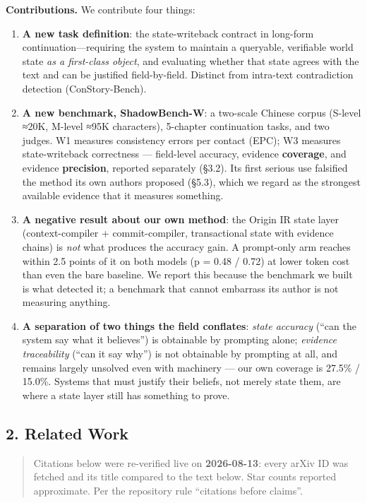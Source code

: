 \documentclass[
  english,
]{article}
\providecommand{\tightlist}{%
  \setlength{\itemsep}{0pt}\setlength{\parskip}{0pt}}
\begin{document}
\textbf{Contributions.} We contribute four things:

\begin{enumerate}
\def\labelenumi{\arabic{enumi}.}
\tightlist
\item
  \textbf{A new task definition}: the state-writeback contract in
  long-form continuation---requiring the system to maintain a queryable,
  verifiable world state \emph{as a first-class object}, and evaluating
  whether that state agrees with the text and can be justified
  field-by-field. Distinct from intra-text contradiction detection
  (ConStory-Bench).
\item
  \textbf{A new benchmark, ShadowBench-W}: a two-scale Chinese corpus
  (S-level ≈20K, M-level ≈95K characters), 5-chapter continuation tasks,
  and two judges. W1 measures consistency errors per contact (EPC); W3
  measures state-writeback correctness --- field-level accuracy,
  evidence \textbf{coverage}, and evidence \textbf{precision}, reported
  separately (§3.2). Its first serious use falsified the method its own
  authors proposed (§5.3), which we regard as the strongest available
  evidence that it measures something.
\item
  \textbf{A negative result about our own method}: the Origin IR state
  layer (context-compiler + commit-compiler, transactional state with
  evidence chains) is \emph{not} what produces the accuracy gain. A
  prompt-only arm reaches within 2.5 points of it on both models (p =
  0.48 / 0.72) at lower token cost than even the bare baseline. We
  report this because the benchmark we built is what detected it; a
  benchmark that cannot embarrass its author is not measuring anything.
\item
  \textbf{A separation of two things the field conflates}: \emph{state
  accuracy} (``can the system say what it believes'') is obtainable by
  prompting alone; \emph{evidence traceability} (``can it say why'') is
  not obtainable by prompting at all, and remains largely unsolved even
  with machinery --- our own coverage is 27.5\% / 15.0\%. Systems that
  must justify their beliefs, not merely state them, are where a state
  layer still has something to prove.
\end{enumerate}

\subsection{2. Related Work}\label{related-work}

\begin{quote}
Citations below were re-verified live on \textbf{2026-08-13}: every
arXiv ID was fetched and its title compared to the text below. Star
counts reported approximate. Per the repository rule ``citations before
claims''.
\end{quote}
\end{document}
